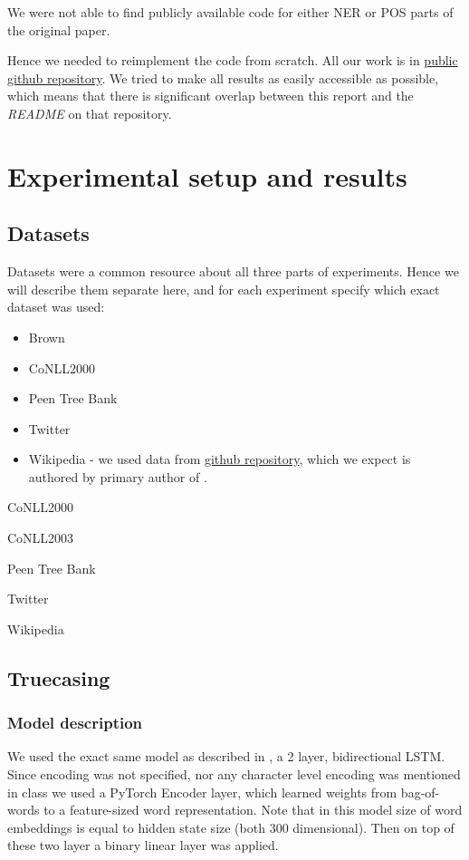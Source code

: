 \documentclass[11pt,a4paper]{article}
\begin{document}
We were not able to find publicly available code for either NER or POS parts of the original paper.

Hence we needed to reimplement the code from scratch. All our work is in \href{https://github.com/andreaskuster/uw-nlp}{public github repository}. We tried to make all results as easily accessible as possible, which means that there is significant overlap between this report and the \textit{README} on that repository.

\section{Experimental setup and results}

\subsection{Datasets}
Datasets were a common resource about all three parts of experiments. Hence we will describe them separate here, and for each experiment specify which exact dataset was used:
\begin{itemize}
    \item Brown
    \item CoNLL2000
    \item Peen Tree Bank
    \item Twitter
    \item Wikipedia - we used data from \href{https://github.com/raymondhs/char-rnn-truecase/tree/master/data/wiki}{github repository}, which we expect is authored by primary author of \cite{susanto-etal-2016-learning}.
\end{itemize}


CoNLL2000

CoNLL2003

Peen Tree Bank

Twitter

Wikipedia


\subsection{Truecasing}
\label{sec:exp-truecase}

    \subsubsection{Model description}
    We used the exact same model as described in \cite{susanto-etal-2016-learning}, a 2 layer, bidirectional LSTM. Since encoding was not specified, nor any character level encoding was mentioned in class we used a PyTorch \cite{pytorch} Encoder layer, which learned weights from bag-of-words to a feature-sized word representation. Note that in this model size of word embeddings is equal to hidden state size (both 300 dimensional). Then on top of these two layer a binary linear layer was applied.
\end{document}
